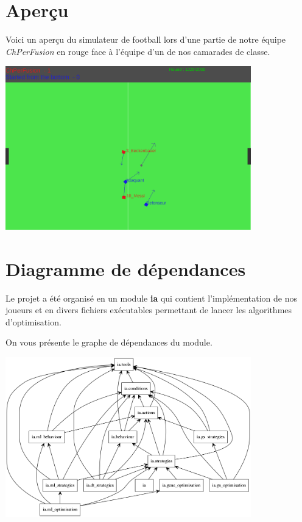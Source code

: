 \documentclass[12pt,a4paper]{article}
\begin{document}
\section*{Aper\c{c}u}
Voici un aper\c{c}u du simulateur de football lors d'une partie de notre 
\'equipe {\itshape ChPerFusion} en rouge face \`a l'\'equipe d'un de nos 
camarades de classe.

\begin{center}
\includegraphics[width=0.8\textwidth]{apercu.png}\par%
\end{center}

\section*{Diagramme de d\'ependances}
Le projet a \'et\'e organis\'e en un module {\bfseries ia} qui contient 
l'impl\'ementation de nos joueurs et en divers fichiers ex\'ecutables 
permettant de lancer les algorithmes d'optimisation.

On vous pr\'esente le graphe de d\'ependances du module.

\begin{center}
  \includegraphics[width=0.8\textwidth]{packages_IA.png}\par%
\end{center}
\end{document}
